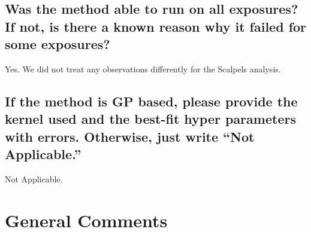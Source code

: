 \documentclass[12pt]{article}
\begin{document}
\subsection{Was the method able to run on all exposures?  If not, is there a known reason why it failed for some exposures?}
Yes.  We did not treat any observations differently for the Scalpels analysis.

\subsection{If the method is GP based, please provide the kernel used and the best-fit hyper parameters with errors.  Otherwise, just write ``Not Applicable.''}
Not Applicable.



\section{General Comments}
\end{document}
